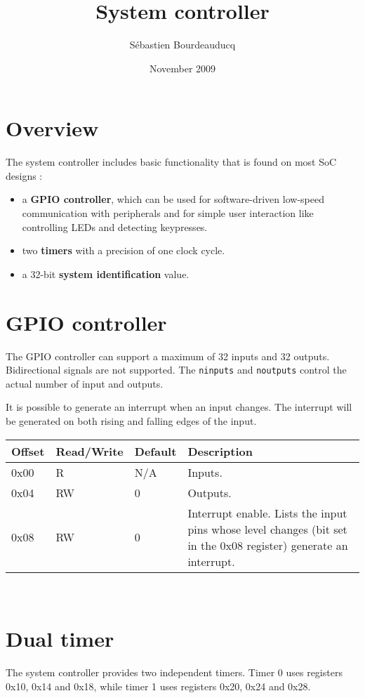 \documentclass[a4paper,11pt]{article}
\title{System controller}
\author{S\'ebastien Bourdeauducq}
\date{November 2009}
\begin{document}
\setlength{\parindent}{0pt}
\setlength{\parskip}{5pt}
\maketitle{}
\section{Overview}

The system controller includes basic functionality that is found on most SoC designs :
\begin{itemize}
\item a \textbf{GPIO controller}, which can be used for software-driven low-speed communication with peripherals and for simple user interaction like controlling LEDs and detecting keypresses.
\item two \textbf{timers} with a precision of one clock cycle.
\item a 32-bit \textbf{system identification} value.
\end{itemize}

\section{GPIO controller}

The GPIO controller can support a maximum of 32 inputs and 32 outputs. Bidirectional signals are not supported. The \verb!ninputs! and \verb!noutputs! control the actual number of input and outputs.

It is possible to generate an interrupt when an input changes. The interrupt will be generated on both rising and falling edges of the input.

\begin{tabularx}{\textwidth}{|l|l|l|X|}
\hline
\bf{Offset} & \bf{Read/Write} & \bf{Default} & \bf{Description} \\
\hline
0x00 & R & N/A & Inputs. \\
\hline
0x04 & RW & 0 & Outputs. \\
\hline
0x08 & RW & 0 & Interrupt enable. Lists the input pins whose level changes (bit set in the 0x08 register) generate an interrupt. \\
\hline
\end{tabularx}\\

\section{Dual timer}
The system controller provides two independent timers. Timer 0 uses registers 0x10, 0x14 and 0x18, while timer 1 uses registers 0x20, 0x24 and 0x28.
\end{document}
